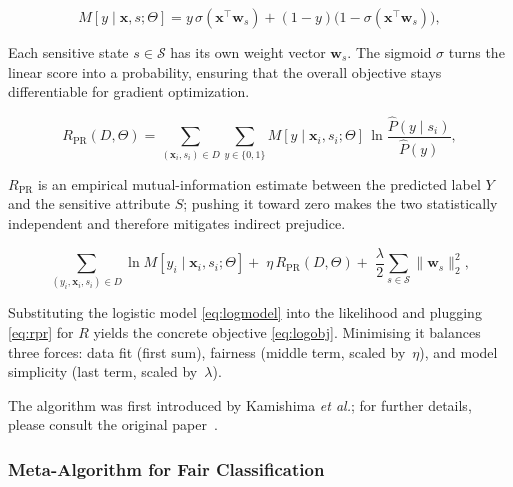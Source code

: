 \documentclass[12pt,a4paper,openright,twoside]{book}
\begin{document}
\begin{equation}
M[y\mid\mathbf{x},s;\Theta]=
y\,\sigma(\mathbf{x}^{\top}\mathbf{w}_{s})+
(1-y)\bigl(1-\sigma(\mathbf{x}^{\top}\mathbf{w}_{s})\bigr),
\tag{8}\label{eq:logmodel}
\end{equation}

\noindent
Each sensitive state \(s\in\mathcal{S}\) has its own weight vector \(\mathbf{w}_{s}\).  The sigmoid \(\sigma\) turns the linear score into a probability, ensuring that the overall objective stays differentiable for gradient optimization.

\begin{equation}
R_{\mathrm{PR}}(D,\Theta)=
\sum_{(\mathbf{x}_i,s_i)\in D}
\sum_{y\in\{0,1\}}
M[y\mid\mathbf{x}_i,s_i;\Theta]\,
\ln\frac{\hat{P}(y\mid s_i)}{\hat{P}(y)},
\tag{11}\label{eq:rpr}
\end{equation}

\noindent
\(R_{\mathrm{PR}}\) is an empirical mutual-information estimate between the predicted label \(Y\) and the sensitive attribute \(S\); pushing it toward zero makes the two statistically independent and therefore mitigates indirect prejudice.

\begin{equation}
\sum_{(y_i,\mathbf{x}_i,s_i)\in D}
\ln M[y_i\mid\mathbf{x}_i,s_i;\Theta]
+\;
\eta\,R_{\mathrm{PR}}(D,\Theta)
+\;
\frac{\lambda}{2}\sum_{s\in\mathcal{S}}\lVert\mathbf{w}_{s}\rVert_{2}^{2},
\tag{12}\label{eq:logobj}
\end{equation}

\noindent
Substituting the logistic model \eqref{eq:logmodel} into the likelihood and plugging \eqref{eq:rpr} for \(R\) yields the concrete objective \eqref{eq:logobj}.  Minimising it balances three forces: data fit (first sum), fairness (middle term, scaled by~\(\eta\)), and model simplicity (last term, scaled by~\(\lambda\)).

The algorithm was first introduced by Kamishima \emph{et al.}; for further details, please consult the original paper~\cite{kamishima2012prejudiceremoverregularizer}.

\subsubsection{Meta-Algorithm for Fair Classification}
\end{document}
